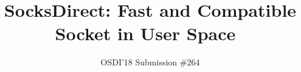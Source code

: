 \documentclass[twocolumn,10pt]{article}
\begin{document}
\pagestyle{plain} %

\date{}

\title{SocksDirect: Fast and Compatible Socket in User Space~\vspace{-0.1in}}

\author{{\rm OSDI'18 Submission \#264}\vspace{-0.5in}}

\maketitle

\newcommand{\specialcell}[2][c]{%
  \begin{tabular}[#1]{@{}c@{}}#2\end{tabular}}







%






\small 
\balance


\end{document}
